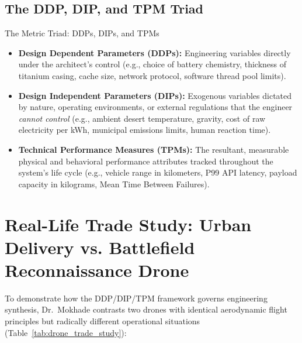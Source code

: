 \subsection{The DDP, DIP, and TPM Triad}
\begin{definitionbox}{The Metric Triad: DDPs, DIPs, and TPMs}
\begin{itemize}[leftmargin=1.5em]
    \item \textbf{Design Dependent Parameters (DDPs):} Engineering variables directly under the architect's control (e.g., choice of battery chemistry, thickness of titanium casing, cache size, network protocol, software thread pool limits).
    \item \textbf{Design Independent Parameters (DIPs):} Exogenous variables dictated by nature, operating environments, or external regulations that the engineer \textit{cannot control} (e.g., ambient desert temperature, gravity, cost of raw electricity per kWh, municipal emissions limits, human reaction time).
    \item \textbf{Technical Performance Measures (TPMs):} The resultant, measurable physical and behavioral performance attributes tracked throughout the system's life cycle (e.g., vehicle range in kilometers, P99 API latency, payload capacity in kilograms, Mean Time Between Failures).
\end{itemize}
\end{definitionbox}

\section{Real-Life Trade Study: Urban Delivery vs. Battlefield Reconnaissance Drone}
\label{sec:drone_trade_study}

To demonstrate how the DDP/DIP/TPM framework governs engineering synthesis, Dr.~Mokhade contrasts two drones with identical aerodynamic flight principles but radically different operational situations (Table~\ref{tab:drone_trade_study}):

